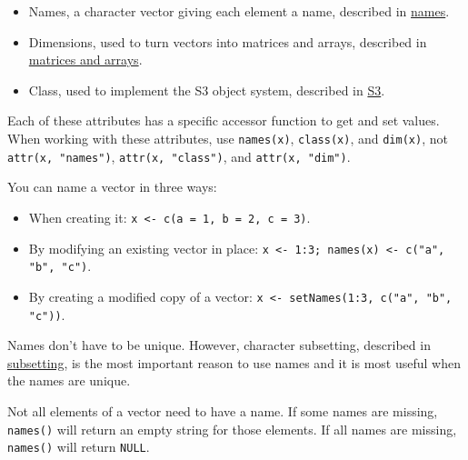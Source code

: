 \begin{itemize}
\item
  Names, a character vector giving each element a name, described in
  \hyperref[vector-names]{names}.
\item
  Dimensions, used to turn vectors into matrices and arrays, described
  in \hyperref[matrices-and-arrays]{matrices and arrays}.
\item
  Class, used to implement the S3 object system, described in
  \hyperref[s3]{S3}.
\end{itemize}

Each of these attributes has a specific accessor function to get and set
values. When working with these attributes, use \texttt{names(x)},
\texttt{class(x)}, and \texttt{dim(x)}, not \texttt{attr(x, "names")},
\texttt{attr(x, "class")}, and \texttt{attr(x, "dim")}.


You can name a vector in three ways: 

\begin{itemize}
\item
  When creating it: \texttt{x \textless{}- c(a = 1, b = 2, c = 3)}.
\item
  By modifying an existing vector in place:
  \texttt{x \textless{}- 1:3; names(x) \textless{}- c("a", "b", "c")}.
\item
  By creating a modified copy of a vector:
  \texttt{x \textless{}- setNames(1:3, c("a", "b", "c"))}.
\end{itemize}

Names don't have to be unique. However, character subsetting, described
in \hyperref[lookup-tables]{subsetting}, is the most important reason to
use names and it is most useful when the names are unique.

Not all elements of a vector need to have a name. If some names are
missing, \texttt{names()} will return an empty string for those
elements. If all names are missing, \texttt{names()} will return
\texttt{NULL}.

\begin{Shaded}
\begin{Highlighting}[]
\StringTok{ }\NormalTok{(} \NormalTok{, }\NormalTok{, }\NormalTok{)}

\StringTok{ }\NormalTok{(}\NormalTok{, }\NormalTok{, }\NormalTok{)}
\end{Highlighting}
\end{Shaded}

